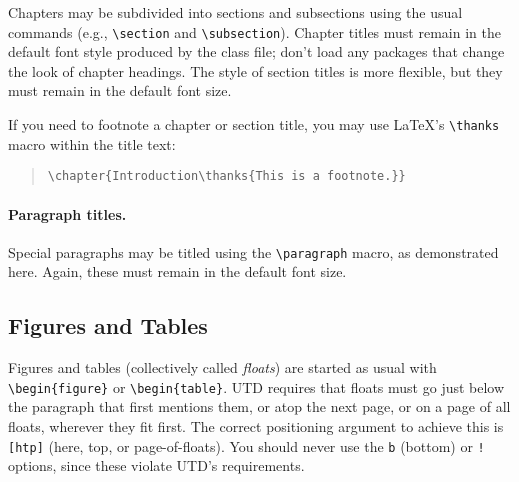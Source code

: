 \documentclass[doublespacing]{utdthesis}
\newenvironment{exampleclasscode}
 {\parindent=1cm\begin{verse}}
 {\end{verse}}
\begin{document}
Chapters may be subdivided into sections and subsections using the
usual commands (e.g., \verb|\section| and \verb|\subsection|).
Chapter titles must remain in the default font style produced by the
class file; don't load any packages that change the look of chapter headings.
The style of section titles is more flexible, but they must remain in the
default font size.

If you need to footnote a chapter or section title, you may use \LaTeX's
\verb|\thanks| macro within the title text:

\begin{exampleclasscode}
\verb|\chapter{Introduction\thanks{This is a footnote.}}|
\end{exampleclasscode}

\paragraph{Paragraph titles.}
Special paragraphs may be titled using the \verb|\paragraph| macro, as
demonstrated here.
Again, these must remain in the default font size.

\subsection{Figures and Tables}
\label{s:floats}

Figures and tables (collectively called \emph{floats}) are started as usual
with \verb|\begin{figure}| or \verb|\begin{table}|.
UTD requires that floats must go just below the paragraph that first mentions
them, or atop the next page, or on a page of all floats, wherever they fit
first.
The correct positioning argument to achieve this is \verb|[htp]|
(here, top, or page-of-floats).
You should never use the \verb|b| (bottom) or \verb|!| options, since these
violate UTD's requirements.
\end{document}
